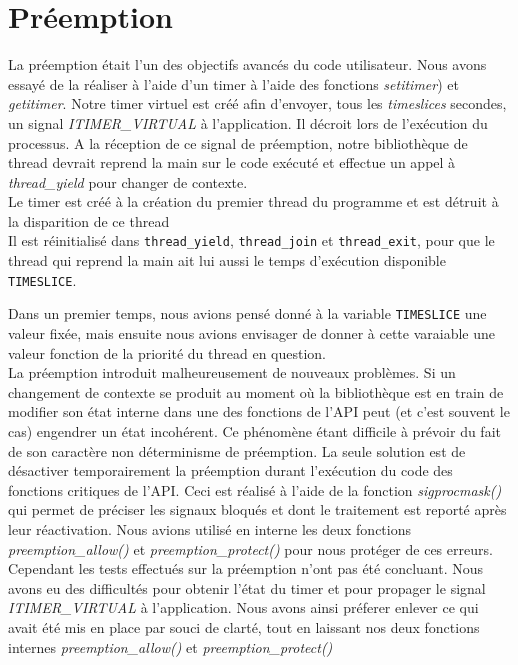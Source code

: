 \section{Préemption}

La préemption était l'un des objectifs avancés du code utilisateur.
Nous avons essayé de la réaliser à l'aide d'un timer à l'aide des fonctions \textit{setitimer}) et \textit{getitimer}. Notre timer virtuel est créé afin d'envoyer, tous les \textit{timeslices} secondes, un signal \textit{ITIMER\_VIRTUAL} à l'application. Il décroit lors de l'exécution du processus.
 A la réception de ce signal de préemption, notre bibliothèque de thread devrait reprend la main sur le code exécuté et effectue un appel à \textit{thread\_yield} pour changer de contexte.\\
Le timer est créé à la création du premier thread du programme et est détruit à la disparition de ce thread
\\
Il est réinitialisé dans \verb$thread_yield$, \verb$thread_join$ et
\verb$thread_exit$, pour que le thread qui reprend la main ait lui aussi le temps d'exécution disponible \verb$TIMESLICE$. 

Dans un premier temps, nous avions pensé donné à la variable \verb$TIMESLICE$ une valeur fixée, mais ensuite nous avions envisager de donner à cette varaiable une valeur fonction de la priorité du thread en question.
\\
La préemption introduit malheureusement de nouveaux problèmes. Si un changement de contexte se produit au moment où la bibliothèque est en train de modifier son état interne dans une des fonctions de l'API peut (et c'est souvent le cas) engendrer un état incohérent. Ce phénomène étant difficile à prévoir du fait de son caractère non déterminisme de préemption. La seule solution est de désactiver temporairement la préemption durant l'exécution du code des fonctions critiques de l'API. Ceci est réalisé à l'aide de la fonction \textit{sigprocmask()} qui permet de préciser les signaux bloqués et dont le traitement est reporté après leur réactivation. Nous avions utilisé en interne les deux fonctions \textit{preemption\_allow()} et \textit{preemption\_protect()} pour nous protéger de ces erreurs.\\

Cependant les tests effectués sur la préemption n'ont pas été concluant. Nous avons eu des difficultés pour obtenir l'état du timer et pour propager le signal \textit{ITIMER\_VIRTUAL} à l'application. Nous avons ainsi préferer enlever ce qui avait été mis en place par souci de clarté, tout en laissant nos deux fonctions internes \textit{preemption\_allow()} et \textit{preemption\_protect()}
